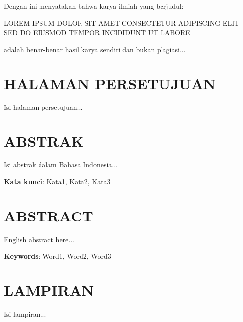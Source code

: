 \documentclass[12pt, a4paper, onecolumn, oneside]{report}
\newcommand{\judul}{LOREM IPSUM DOLOR SIT AMET CONSECTETUR ADIPISCING ELIT SED DO EIUSMOD TEMPOR INCIDIDUNT UT LABORE}
\begin{document}
Dengan ini menyatakan bahwa karya ilmiah yang berjudul:

\judul

adalah benar-benar hasil karya sendiri dan bukan plagiasi...

\cleardoublepage
\chapter*{HALAMAN PERSETUJUAN}
Isi halaman persetujuan...

\cleardoublepage
\chapter*{ABSTRAK}
Isi abstrak dalam Bahasa Indonesia...

\vspace{1cm}
\textbf{Kata kunci}: Kata1, Kata2, Kata3

\cleardoublepage
\chapter*{ABSTRACT}
English abstract here...

\vspace{1cm}
\textbf{Keywords}: Word1, Word2, Word3

\cleardoublepage
\tableofcontents
\cleardoublepage
\listoffigures
\cleardoublepage
\listoftables

\cleardoublepage

\cleardoublepage

\cleardoublepage

\cleardoublepage

\cleardoublepage


\cleardoublepage
\renewcommand{\bibname}{DAFTAR PUSTAKA}



\cleardoublepage
\appendix
\chapter*{LAMPIRAN}
Isi lampiran...
\end{document}
